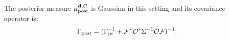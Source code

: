





The posterior measure $\mu_{\textup{post}}^{\mathbf{d}, \mathcal{O}}$ is Gaussian in this setting and its
covariance operator is:
\begin{align}\label{eq:postcov}
  \postcov = (\prcov^{-1} + \fwd^* \obs^* \Sigma^{-1} \obs \fwd
  )^{-1}.
\end{align}


